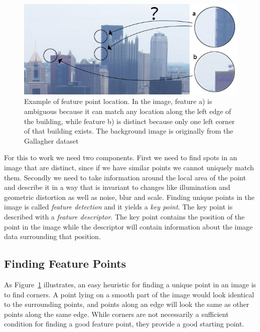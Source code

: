 \begin{figure}[t]
	\centering
	\includegraphics[width=1\columnwidth]{images/feature_point}
	\caption{Example of feature point location. In the image, feature a) 
is ambiguous because it can match any location along the left edge of 
the building, while feature b) is distinct because only one left corner 
of that building exists. The background image is originally from the 
Gallagher dataset \cite{gallagher2008}}
	\label{fig:feature_point}
\end{figure}

For this to work we need two components. First we need to find spots in 
an image that are distinct, since if we have similar points we cannot 
uniquely match them. Secondly we need to take information around the 
local area of the point and describe it in a way that is invariant to 
changes like illumination and geometric distortion as well as noise, 
blur and scale. Finding unique points in the image is called 
\emph{feature detection} and it yields a \emph{key point}. The key point
is described with a \emph{feature descriptor}. The key point contains 
the position of the point in the image while the descriptor will contain 
information about the image data surrounding that position.

\subsection{Finding Feature Points}

As Figure~\ref{fig:feature_point} illustrates, an easy heuristic for 
finding a unique point in an image is to find corners. A point lying on 
a smooth part of the image would look identical to the surrounding 
points, and points along an edge will look the same as other points 
along the same edge. While corners are not necessarily a sufficient 
condition for finding a good feature point, they provide a good starting 
point.

